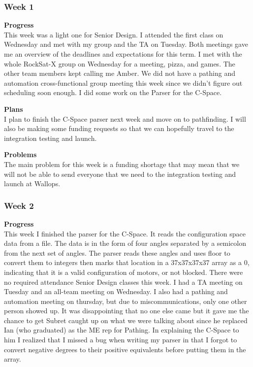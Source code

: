 \subsubsection{Week 1}
\textbf{Progress} \\
This week was a light one for Senior Design. I attended the first class on Wednesday and met with my group and the TA on Tuesday. Both meetings gave me an overview of the deadlines and expectations for this term. I met with the whole RockSat-X group on Wednesday for a meeting, pizza, and games. The other team members kept calling me Amber. We did not have a pathing and automation cross-functional group meeting this week since we didn't figure out scheduling soon enough. I did some work on the Parser for the C-Space.

\textbf{Plans} \\ 
I plan to finish the C-Space parser next week and move on to pathfinding. I will also be making some funding requests so that we can hopefully travel to the integration testing and launch.

\textbf{Problems} \\ 
The main problem for this week is a funding shortage that may mean that we will not be able to send everyone that we need to the integration testing and launch at Wallops.


\subsubsection{Week 2}
\textbf{Progress} \\
This week I finished the parser for the C-Space. It reads the configuration space data from a file. The data is in the form of four angles separated by a semicolon from the next set of angles. The parser reads these angles and uses floor to convert them to integers then marks that location in a 37x37x37x37 array as a 0, indicating that it is a valid configuration of motors, or not blocked. There were no required attendance Senior Design classes this week. I had a TA meeting on Tuesday and an all-team meeting on Wednesday. I also had a pathing and automation meeting on thursday, but due to miscommunications, only one other person showed up. It was disappointing that no one else came but it gave me the chance to get Subret caught up on what we were talking about since he replaced Ian (who graduated) as the ME rep for Pathing. In explaining the C-Space to him I realized that I missed a bug when writing my parser in that I forgot to convert negative degrees to their positive equivalents before putting them in the array.

